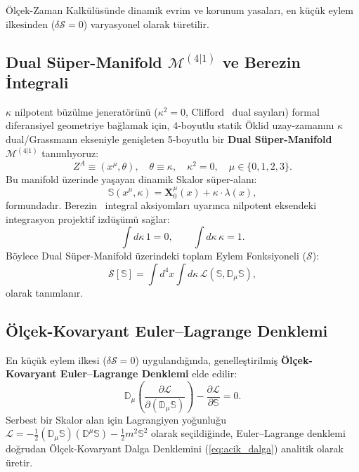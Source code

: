 \documentclass[11pt,a4paper]{article}
\begin{document}
Ölçek-Zaman Kalkülüsünde dinamik evrim ve korunum yasaları, en küçük eylem ilkesinden ($\delta \mathcal{S} = 0$) varyasyonel olarak türetilir.

\subsection{Dual Süper-Manifold $\mathcal{M}^{(4|1)}$ ve Berezin İntegrali}
$\kappa$ nilpotent büzülme jeneratörünü ($\kappa^2 = 0$, Clifford~\cite{clifford1873} dual sayıları) formal diferansiyel geometriye bağlamak için, 4-boyutlu statik Öklid uzay-zamanını $\kappa$ dual/Grassmann ekseniyle genişleten 5-boyutlu bir \textbf{Dual Süper-Manifold} $\mathcal{M}^{(4|1)}$ tanımlıyoruz:
\begin{equation}
    Z^A \equiv \left( x^\mu, \theta \right), \quad \theta \equiv \kappa, \quad \kappa^2 = 0, \quad \mu \in \{0, 1, 2, 3\}.
    \label{eq:super_koordinat_sc}
\end{equation}
Bu manifold üzerinde yaşayan dinamik Skalor süper-alanı:
\begin{equation}
    \mathbb{S}\left(x^\mu, \kappa\right) = \mathbf{X}_0^\mu(x) + \kappa \cdot \lambda(x),
    \label{eq:skalor_super_alan_sc}
\end{equation}
formundadır. Berezin~\cite{berezin1966} integral aksiyomları uyarınca nilpotent eksendeki integrasyon projektif izdüşümü sağlar:
\begin{equation}
    \int d\kappa \, 1 = 0, \qquad \int d\kappa \, \kappa = 1.
    \label{eq:berezin_kurallari_sc}
\end{equation}
Böylece Dual Süper-Manifold üzerindeki toplam Eylem Fonksiyoneli ($\mathcal{S}$):
\begin{equation}
    \mathcal{S}[\mathbb{S}] = \int d^4x \int d\kappa \, \mathcal{L}\left(\mathbb{S}, \mathbb{D}_\mu \mathbb{S}\right),
    \label{eq:skalor_eylem_fonksiyoneli_sc}
\end{equation}
olarak tanımlanır.

\subsection{Ölçek-Kovaryant Euler--Lagrange Denklemi}
En küçük eylem ilkesi ($\delta \mathcal{S} = 0$) uygulandığında, genelleştirilmiş \textbf{Ölçek-Kovaryant Euler--Lagrange Denklemi} elde edilir:
\begin{equation}
    \mathbb{D}_\mu \left( \frac{\partial \mathcal{L}}{\partial (\mathbb{D}_\mu \mathbb{S})} \right) - \frac{\partial \mathcal{L}}{\partial \mathbb{S}} = 0.
    \label{eq:euler_lagrange_olcek}
\end{equation}
Serbest bir Skalor alan için Lagrangiyen yoğunluğu $\mathcal{L} = -\frac{1}{2} (\mathbb{D}_\mu \mathbb{S})(\mathbb{D}^\mu \mathbb{S}) - \frac{1}{2} m^2 \mathbb{S}^2$ olarak seçildiğinde, Euler--Lagrange denklemi doğrudan Ölçek-Kovaryant Dalga Denklemini (\ref{eq:acik_dalga}) analitik olarak üretir.
\end{document}
